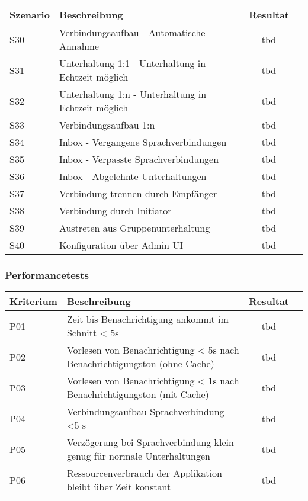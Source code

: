 \begin{table}[h]
    \centering
    \begin{tabular}{|l|p{11cm}|c|c|}
        \hline
        \textbf{Szenario} & \textbf{Beschreibung} & \textbf{Resultat} \\
        \hline
        S30         & Verbindungsaufbau - Automatische Annahme & tbd\\
        \hline
        S31         & Unterhaltung 1:1 - Unterhaltung in Echtzeit möglich & tbd\\
        \hline
        S32         & Unterhaltung 1:n - Unterhaltung in Echtzeit möglich & tbd\\
        \hline
        S33         & Verbindungsaufbau 1:n & tbd\\
        \hline
        S34         & Inbox - Vergangene Sprachverbindungen & tbd\\
        \hline
        S35         & Inbox - Verpasste Sprachverbindungen & tbd\\
        \hline
        S36         & Inbox - Abgelehnte Unterhaltungen & tbd\\
        \hline
        S37         & Verbindung trennen durch Empfänger & tbd\\
        \hline
        S38         & Verbindung durch Initiator & tbd\\
        \hline
        S39         & Austreten aus Gruppenunterhaltung & tbd\\
        \hline
        S40         & Konfiguration über Admin UI & tbd\\
        \hline
    \end{tabular}\label{tab:funktion_testplan_2}
\end{table}

\subsubsection{Performancetests}

\begin{table}[h]
    \centering
    \begin{tabular}{|l|p{11cm}|c|c|}
        \hline
        \textbf{Kriterium} & \textbf{Beschreibung} & \textbf{Resultat} \\
        \hline
        P01         & Zeit bis Benachrichtigung ankommt im Schnitt < 5s & tbd\\
        \hline
        P02         & Vorlesen von Benachrichtigung < 5s nach Benachrichtigungston (ohne Cache) & tbd\\
        \hline
        P03         & Vorlesen von Benachrichtigung < 1s nach Benachrichtigungston (mit Cache) & tbd\\
        \hline
        P04         & Verbindungsaufbau Sprachverbindung <5 s  & tbd\\
        \hline
        P05         & Verzögerung bei Sprachverbindung klein genug für normale Unterhaltungen & tbd\\
        \hline
        P06         & Ressourcenverbrauch der Applikation bleibt über Zeit konstant & tbd\\
        \hline
    \end{tabular}\label{tab:testplan_performance}
\end{table}
\clearpage
